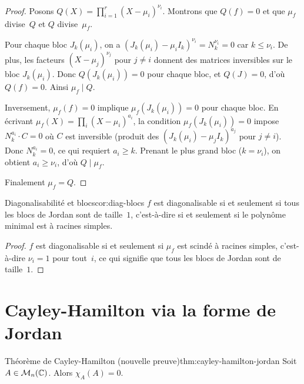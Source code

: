 \begin{proof}
  Posons $Q(X)=\prod_{i=1}^{r}(X-\mu_i)^{\nu_i}$. Montrons que
  $Q(f)=0$ et que $\mu_f$ divise~$Q$ et $Q$ divise~$\mu_f$.

  Pour chaque bloc $J_k(\mu_i)$, on a
  $(J_k(\mu_i)-\mu_i I_k)^{\nu_i}=N_k^{\nu_i}=0$ car $k\leq\nu_i$.
  De plus, les facteurs $(X-\mu_j)^{\nu_j}$ pour $j\neq i$ donnent
  des matrices inversibles sur le bloc $J_k(\mu_i)$. Donc
  $Q(J_k(\mu_i))=0$ pour chaque bloc, et $Q(J)=0$, d'où $Q(f)=0$.
  Ainsi $\mu_f\mid Q$.

  Inversement, $\mu_f(f)=0$ implique $\mu_f(J_k(\mu_i))=0$ pour chaque
  bloc. En écrivant $\mu_f(X)=\prod_i(X-\mu_i)^{a_i}$, la condition
  $\mu_f(J_k(\mu_i))=0$ impose $N_k^{a_i}\cdot C=0$ où $C$ est
  inversible (produit des $(J_k(\mu_i)-\mu_j I_k)^{a_j}$ pour $j\neq i$).
  Donc $N_k^{a_i}=0$, ce qui requiert $a_i\geq k$. Prenant le plus
  grand bloc ($k=\nu_i$), on obtient $a_i\geq\nu_i$, d'où $Q\mid\mu_f$.

  Finalement $\mu_f=Q$.
\end{proof}

\begin{corollary}{Diagonalisabilité et blocs}{cor:diag-blocs}
  $f$ est diagonalisable si et seulement si tous les blocs de Jordan
  sont de taille~$1$, c'est-à-dire si et seulement si le polynôme
  minimal est à racines simples.
\end{corollary}

\begin{proof}
  $f$ est diagonalisable si et seulement si $\mu_f$ est scindé à
  racines simples, c'est-à-dire $\nu_i=1$ pour tout~$i$, ce qui
  signifie que tous les blocs de Jordan sont de taille~$1$.
\end{proof}


\section{Cayley-Hamilton via la forme de Jordan}\label{sec:cayley-hamilton-jordan}

\begin{theorem}{Théorème de Cayley-Hamilton (nouvelle preuve)}{thm:cayley-hamilton-jordan}
  Soit $A\in\mathcal{M}_n({\mathbb{C}})$. Alors $\chi_A(A)=0$.
\end{theorem}

